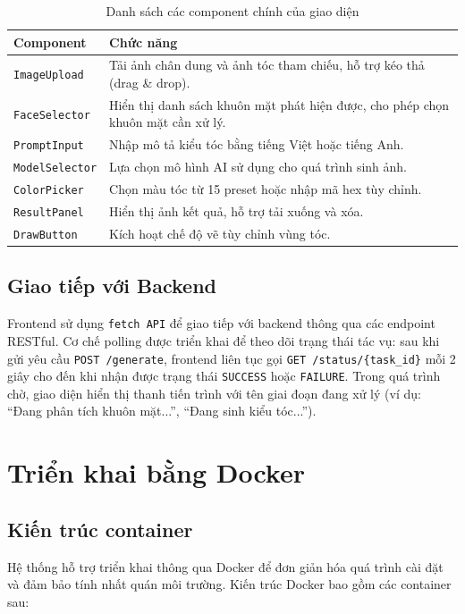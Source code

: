\documentclass[../main.tex]{subfiles}
\begin{document}
\begin{table}[H]
    \centering
    \caption{Danh sách các component chính của giao diện}
    \label{tab:frontend-components}
    \begin{tabularx}{\textwidth}{|>{\raggedright\arraybackslash}p{4cm}|X|}
        \hline
        \textbf{Component} & \textbf{Chức năng} \\
        \hline
        \texttt{ImageUpload} & Tải ảnh chân dung và ảnh tóc tham chiếu, hỗ trợ kéo thả (drag \& drop). \\
        \hline
        \texttt{FaceSelector} & Hiển thị danh sách khuôn mặt phát hiện được, cho phép chọn khuôn mặt cần xử lý. \\
        \hline
        \texttt{PromptInput} & Nhập mô tả kiểu tóc bằng tiếng Việt hoặc tiếng Anh. \\
        \hline
        \texttt{ModelSelector} & Lựa chọn mô hình AI sử dụng cho quá trình sinh ảnh. \\
        \hline
        \texttt{ColorPicker} & Chọn màu tóc từ 15 preset hoặc nhập mã hex tùy chỉnh. \\
        \hline
        \texttt{ResultPanel} & Hiển thị ảnh kết quả, hỗ trợ tải xuống và xóa. \\
        \hline
        \texttt{DrawButton} & Kích hoạt chế độ vẽ tùy chỉnh vùng tóc. \\
        \hline
    \end{tabularx}
\end{table}

\subsection{Giao tiếp với Backend}
Frontend sử dụng \texttt{fetch API} để giao tiếp với backend thông qua các endpoint RESTful. Cơ chế polling được triển khai để theo dõi trạng thái tác vụ: sau khi gửi yêu cầu \texttt{POST /generate}, frontend liên tục gọi \texttt{GET /status/\{task\_id\}} mỗi 2 giây cho đến khi nhận được trạng thái \texttt{SUCCESS} hoặc \texttt{FAILURE}. Trong quá trình chờ, giao diện hiển thị thanh tiến trình với tên giai đoạn đang xử lý (ví dụ: ``Đang phân tích khuôn mặt...'', ``Đang sinh kiểu tóc...'').

\section{Triển khai bằng Docker}

\subsection{Kiến trúc container}
Hệ thống hỗ trợ triển khai thông qua Docker để đơn giản hóa quá trình cài đặt và đảm bảo tính nhất quán môi trường. Kiến trúc Docker bao gồm các container sau:
\end{document}
